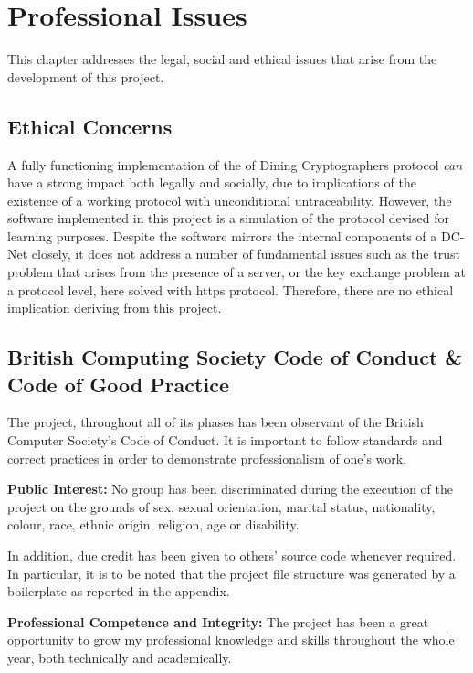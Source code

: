 \chapter{Professional Issues}
This chapter addresses the legal, social and ethical issues that arise from the development of this project.

\section{Ethical Concerns}
A fully functioning implementation of the of Dining Cryptographers protocol \textit{can} have a strong impact both legally and socially, due to implications of the existence of a working protocol with unconditional untraceability. However, the software implemented in this project is a simulation of the protocol devised for learning purposes. Despite the software mirrors the internal components of a DC-Net closely, it does not address a number of fundamental issues such as the trust problem that arises from the presence of a server, or the key exchange problem at a protocol level, here solved with https protocol. Therefore, there are no ethical implication deriving from this project.


\section{British Computing Society Code of Conduct \& Code of Good Practice}
The project, throughout all of its phases has been observant of the British Computer Society's Code of Conduct. It is important to follow standards and correct practices in order to demonstrate professionalism of one's work. \newline


\textbf{Public Interest:} No group has been discriminated during the execution of the project on the grounds of sex, sexual orientation, marital status, nationality, colour, race, ethnic origin, religion, age or disability. 

In addition, due credit has been given to others' source code whenever required. In particular, it is to be noted that the project file structure was generated by a boilerplate as reported in the appendix. \newline 

\textbf{Professional Competence and Integrity:} The project has been a great opportunity to grow my professional knowledge and skills throughout the whole year, both technically and academically. 

